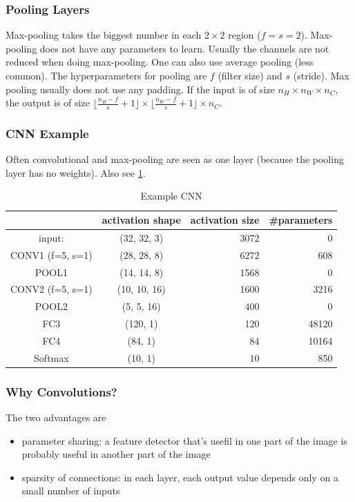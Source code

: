 \documentclass{article}
\begin{document}
\subsubsection{Pooling Layers}
Max-pooling takes the biggest number in each $2\times 2$ region ($f=s=2$).
Max-pooling does not have any parameters to learn.
Usually the channels are not reduced when doing max-pooling.
One can also use average pooling (less common).
The hyperparameters for pooling are $f$ (filter size) and $s$ (stride).
Max pooling usually does not use any padding.
If the input is of size $n_H\times n_W\times n_C$, the output is of size
$\lfloor\frac{n_H-f}{s}+1\rfloor\times\lfloor\frac{n_W-f}{s}+1\rfloor\times n_C$.

\subsubsection{CNN Example}
Often convolutional and max-pooling are seen as one layer (because the pooling layer has no weights).
Also see \cref{tbl:cnnexample}.
\begin{table}
  \begin{tabular}{c|crr}\toprule
    & activation shape & activation size & \#parameters\\\midrule
    input:           & (32, 32,  3) & 3072 &     0 \\
    CONV1 (f=5, s=1) & (28, 28,  8) & 6272 &   608 \\
    POOL1            & (14, 14,  8) & 1568 &     0 \\
    CONV2 (f=5, s=1) & (10, 10, 16) & 1600 &  3216 \\
    POOL2            & (5, 5, 16)   &  400 &     0 \\
    FC3              & (120, 1)     &  120 & 48120 \\
    FC4              & (84, 1)      &   84 & 10164 \\
    Softmax          & (10, 1)      &   10 &   850 \\\bottomrule
  \end{tabular}
  \caption{Example CNN\label{tbl:cnnexample}}
\end{table}

\subsubsection{Why Convolutions?}
The two advantages are
\begin{itemize}
  \item parameter sharing: a feature detector that's usefil in one part of the image is probably useful in another part of the image
  \item sparsity of connections: in each layer, each output value depends only on a small number of inputs
\end{itemize}
\end{document}
